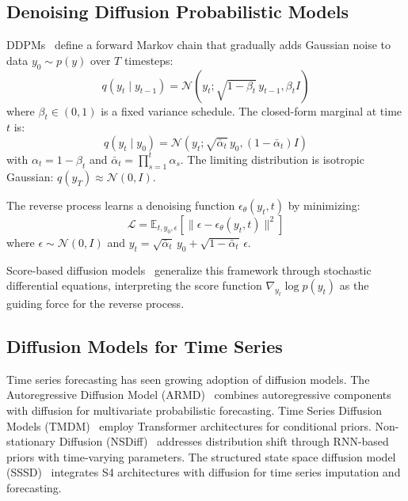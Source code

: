 \documentclass[conference]{IEEEtran}
\begin{document}
\subsection{Denoising Diffusion Probabilistic Models}

DDPMs~\cite{Ho2020DDPM} define a forward Markov chain that gradually adds Gaussian noise to data $y_0 \sim p(y)$ over $T$ timesteps:
\begin{equation}
q(y_t \mid y_{t-1}) = \mathcal{N}(y_t; \sqrt{1-\beta_t}\, y_{t-1}, \beta_t I)
\end{equation}
where $\beta_t \in (0,1)$ is a fixed variance schedule. The closed-form marginal at time $t$ is:
\begin{equation}
q(y_t \mid y_0) = \mathcal{N}(y_t; \sqrt{\bar{\alpha}_t}\, y_0, (1 - \bar{\alpha}_t) I) \label{eq:ddpm_marginal}
\end{equation}
with $\alpha_t = 1-\beta_t$ and $\bar{\alpha}_t = \prod_{s=1}^t \alpha_s$. The limiting distribution is isotropic Gaussian: $q(y_T) \approx \mathcal{N}(0, I)$.

The reverse process learns a denoising function $\epsilon_\theta(y_t, t)$ by minimizing:
\begin{equation}
\mathcal{L} = \mathbb{E}_{t, y_0, \epsilon} \left[ \| \epsilon - \epsilon_\theta(y_t, t) \|^2 \right]
\end{equation}
where $\epsilon \sim \mathcal{N}(0, I)$ and $y_t = \sqrt{\bar{\alpha}_t}\, y_0 + \sqrt{1 - \bar{\alpha}_t}\, \epsilon$.

Score-based diffusion models~\cite{Song2020SDE} generalize this framework through stochastic differential equations, interpreting the score function $\nabla_{y_t} \log p(y_t)$ as the guiding force for the reverse process.

\subsection{Diffusion Models for Time Series}

Time series forecasting has seen growing adoption of diffusion models. The Autoregressive Diffusion Model (ARMD)~\cite{ARMD} combines autoregressive components with diffusion for multivariate probabilistic forecasting. Time Series Diffusion Models (TMDM)~\cite{TMDM} employ Transformer architectures for conditional priors. Non-stationary Diffusion (NSDiff)~\cite{NSDiff} addresses distribution shift through RNN-based priors with time-varying parameters. The structured state space diffusion model (SSSD)~\cite{Alcaraz2022SSSD} integrates S4 architectures with diffusion for time series imputation and forecasting.
\end{document}
